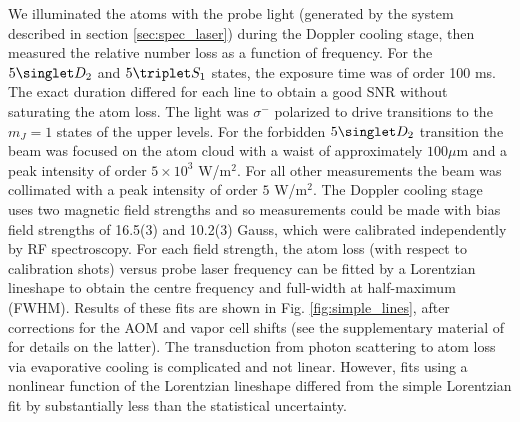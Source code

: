 

	

	We illuminated the atoms with the probe light (generated by the system described in section \ref{sec:spec_laser}) during the Doppler cooling stage, then measured the relative number loss as a function of frequency.
	For the $5\singlet D_2$ and $5\triplet S_1$ states, the exposure time was of order 100 ms.
	The exact duration differed for each line to obtain a good SNR without saturating the atom loss.
	The light was $\sigma^-$ polarized to drive transitions to the $m_J=1$ states of the upper levels.
	For the forbidden $5\singlet D_2$ transition the beam was focused on the atom cloud with a waist of approximately $100\mu$m and a peak intensity of order $5\times 10^3$ W/m$^2$.
	For all other measurements the beam was collimated with a peak intensity of order $ 5$ W/m$^2$.
	The Doppler cooling stage uses two magnetic field strengths and so measurements could be made with bias field strengths of {16.5(3)} and {10.2(3)} Gauss, which were calibrated independently by RF spectroscopy.
	For each field strength, the atom loss (with respect to calibration shots) versus probe laser frequency can be fitted by a Lorentzian lineshape to obtain the centre frequency and full-width at half-maximum (FWHM).
	Results of these fits are shown in Fig.
	\ref{fig:simple_lines}, after corrections for the AOM and vapor cell shifts (see the supplementary material of \cite{Thomas20} for details on the latter).
	{The transduction from photon scattering to atom loss via evaporative cooling is complicated and not linear.
	However, fits using a nonlinear function of the Lorentzian lineshape differed from the simple Lorentzian fit by substantially less than the statistical uncertainty.}

